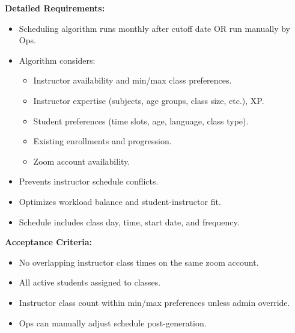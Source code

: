 \textbf{Detailed Requirements:}
\begin{itemize}
    \item Scheduling algorithm runs monthly after cutoff date OR run manually by Ops.
    \item Algorithm considers:
    \begin{itemize}
        \item Instructor availability and min/max class preferences.
        \item Instructor expertise (subjects, age groups, class size, etc.), XP.
        \item Student preferences (time slots, age, language, class type).
        \item Existing enrollments and progression.
        \item Zoom account availability.
    \end{itemize}
    \item Prevents instructor schedule conflicts.
    \item Optimizes workload balance and student-instructor fit.
    \item Schedule includes class day, time, start date, and frequency.
\end{itemize}

\textbf{Acceptance Criteria:}
\begin{itemize}
    \item No overlapping instructor class times on the same zoom account.
    \item All active students assigned to classes.
    \item Instructor class count within min/max preferences unless admin override.
    \item Ops can manually adjust schedule post-generation.
\end{itemize}



